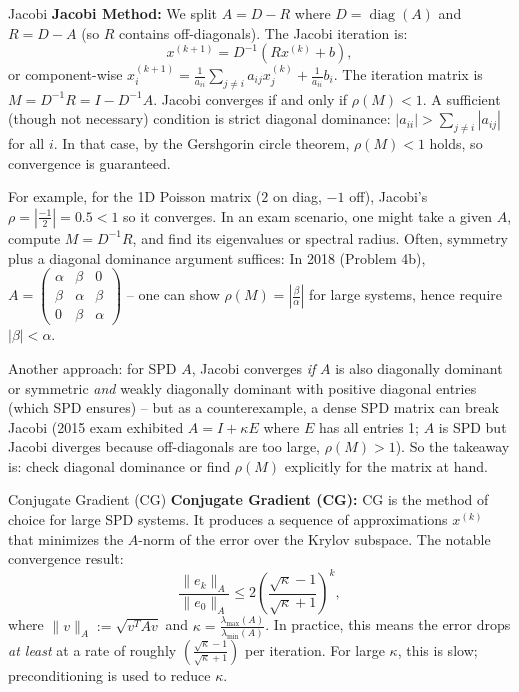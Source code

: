 \documentclass[a4paper,11pt]{report}
\begin{document}
\begin{outline}{Jacobi}{}
    \textbf{Jacobi Method:} We split $A = D - R$ where $D=\operatorname{diag}(A)$ and $R = D - A$ (so $R$ contains off-diagonals). The Jacobi iteration is:
    \[ x^{(k+1)} = D^{-1}(R x^{(k)} + b), \]
    or component-wise $x_i^{(k+1)} = \frac{1}{a_{ii}}\sum_{j\neq i} a_{ij}x_j^{(k)} + \frac{1}{a_{ii}}b_i$. The iteration matrix is $M = D^{-1}R = I - D^{-1}A$. Jacobi converges if and only if $\rho(M)<1$. A sufficient (though not necessary) condition is strict diagonal dominance: $|a_{ii}| > \sum_{j\neq i}|a_{ij}|$ for all $i$. In that case, by the Gershgorin circle theorem, $\rho(M)<1$ holds, so convergence is guaranteed.

    For example, for the 1D Poisson matrix ($2$ on diag, $-1$ off), Jacobi's $\rho = |\frac{-1}{2}| = 0.5 < 1$ so it converges. In an exam scenario, one might take a given $A$, compute $M = D^{-1}R$, and find its eigenvalues or spectral radius. Often, symmetry plus a diagonal dominance argument suffices: In 2018 (Problem 4b), $A=\begin{pmatrix}\alpha & \beta &0\\ \beta&\alpha&\beta\\0&\beta&\alpha\end{pmatrix}$ -- one can show $\rho(M)=|\frac{\beta}{\alpha}|$ for large systems, hence require $|\beta|<\alpha$.

    Another approach: for SPD $A$, Jacobi converges \textit{if} $A$ is also diagonally dominant or symmetric \textit{and} weakly diagonally dominant with positive diagonal entries (which SPD ensures) -- but as a counterexample, a dense SPD matrix can break Jacobi (2015 exam exhibited $A=I+\kappa E$ where $E$ has all entries 1; $A$ is SPD but Jacobi diverges because off-diagonals are too large, $\rho(M)>1$). So the takeaway is: check diagonal dominance or find $\rho(M)$ explicitly for the matrix at hand.
\end{outline}
\begin{outline}{Conjugate Gradient (CG)}{}
    \textbf{Conjugate Gradient (CG):} CG is the method of choice for large SPD systems. It produces a sequence of approximations $x^{(k)}$ that minimizes the $A$-norm of the error over the Krylov subspace. The notable convergence result:
    \[ \frac{\|e_{k}\|_A}{\|e_0\|_A} \le 2\left(\frac{\sqrt{\kappa}-1}{\sqrt{\kappa}+1}\right)^k, \]
    where $\|v\|_A := \sqrt{v^T A v}$ and $\kappa = \frac{\lambda_{\max}(A)}{\lambda_{\min}(A)}$. In practice, this means the error drops \textit{at least} at a rate of roughly $\left(\frac{\sqrt{\kappa}-1}{\sqrt{\kappa}+1}\right)$ per iteration. For large $\kappa$, this is slow; preconditioning is used to reduce $\kappa$.
\end{outline}
\end{document}
